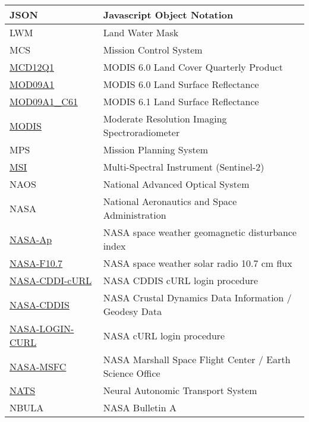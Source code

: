 \documentclass[dec_sum_main.tex]{subfiles}
\begin{document}
\begin{longtable}{|m{2.8cm}|m{10cm}|}
	JSON & Javascript Object Notation \\ \hline
    LWM & Land Water Mask \\ \hline
    MCS & Mission Control System \\ \hline
    \href{https://ladsweb.modaps.eosdis.nasa.gov/filespec/MODIS/6/MCD12Q1}{MCD12Q1} & MODIS 6.0 Land Cover Quarterly Product \\ \hline
    \href{https://ladsweb.modaps.eosdis.nasa.gov/filespec/MODIS/6/MOD09A1}{MOD09A1} & MODIS 6.0 Land Surface Reflectance \\ \hline
    \href{https://ladsweb.modaps.eosdis.nasa.gov/filespec/MODIS/61/MOD09A1_c61}{MOD09A1\_C61} & MODIS 6.1 Land Surface Reflectance \\ \hline
    \href{https://modis.gsfc.nasa.gov}{MODIS} & Moderate Resolution Imaging Spectroradiometer \\ \hline
    MPS & Mission Planning System \\ \hline
	\href{https://sentinels.copernicus.eu/web/sentinel/technical-guides/sentinel-2-msi/msi-instrument}{MSI} & Multi-Spectral Instrument (Sentinel-2) \\ \hline
	NAOS & National Advanced Optical System \\ \hline
    NASA & National Aeronautics and Space Administration \\ \hline
    \href{https://www.nasa.gov/msfcsolar}{NASA-Ap} & NASA space weather geomagnetic disturbance index \\ \hline
    \href{https://www.nasa.gov/msfcsolar}{NASA-F10.7} & NASA space weather solar radio 10.7 cm flux \\ \hline
    \href{https://cddis.nasa.gov/About/CDDIS_File_Download_Documentation.html}{NASA-CDDI-cURL} & NASA CDDIS cURL login procedure \\ \hline
    \href{https://cddis.nasa.gov/About/Background.html}{NASA-CDDIS} & NASA Crustal Dynamics Data Information / Geodesy Data \\ \hline
    \href{https://wiki.earthdata.nasa.gov/display/EL/How+To+Access+Data+With+cURL+And+Wget}{NASA-LOGIN-CURL} & NASA cURL login procedure\\ \hline       
    \href{https://weather.msfc.nasa.gov/}{NASA-MSFC} & NASA Marshall Space Flight Center / Earth Science Office \\ \hline 
    \href{https://docs.nats.io/reference/faq}{NATS} & Neural Autonomic Transport System \\ \hline
    NBULA & NASA Bulletin A \\ \hline

\end{longtable}
\end{document}

